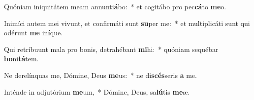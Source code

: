 \item Quóniam iniquitátem meam annunti\textbf{á}bo:~* et cogitábo pro pec\textbf{cá}to \textbf{me}o.
\item Inimíci autem mei vivunt, et confirmáti sunt \textbf{su}per me:~* et multiplicáti sunt qui odérunt \textbf{me} in\textbf{í}que.
\item Qui retríbuunt mala pro bonis, detrahébant \textbf{mi}hi:~* quóniam sequébar \textbf{bo}ni\textbf{tá}tem.
\item Ne derelínquas me, Dómine, Deus \textbf{me}us:~* ne di\textbf{scés}seris \textbf{a} me.
\item Inténde in adjutórium \textbf{me}um,~* Dómine, Deus, sa\textbf{lú}tis \textbf{me}æ.
